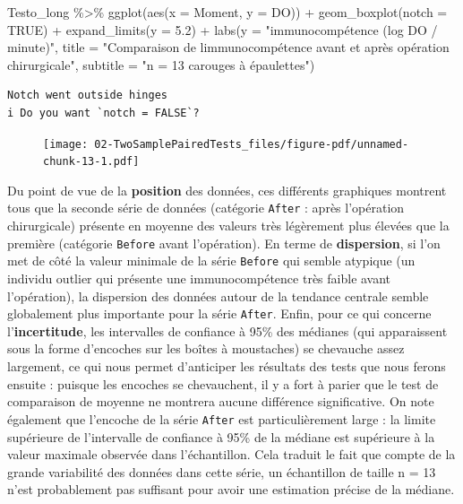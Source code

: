 \documentclass[
  a4paper,
  DIV=11,
  numbers=noendperiod,
  oneside]{scrreprt}
\newenvironment{Shaded}{}{}
\newcommand{\AttributeTok}[1]{\textcolor[rgb]{0.84,0.23,0.29}{#1}}
\newcommand{\ConstantTok}[1]{\textcolor[rgb]{0.00,0.36,0.77}{#1}}
\newcommand{\FloatTok}[1]{\textcolor[rgb]{0.00,0.36,0.77}{#1}}
\newcommand{\FunctionTok}[1]{\textcolor[rgb]{0.44,0.26,0.76}{#1}}
\newcommand{\NormalTok}[1]{\textcolor[rgb]{0.14,0.16,0.18}{#1}}
\newcommand{\SpecialCharTok}[1]{\textcolor[rgb]{0.00,0.36,0.77}{#1}}
\newcommand{\StringTok}[1]{\textcolor[rgb]{0.01,0.18,0.38}{#1}}
\begin{document}
\begin{Shaded}
\begin{Highlighting}[]
\NormalTok{Testo\_long }\SpecialCharTok{\%\textgreater{}\%}
  \FunctionTok{ggplot}\NormalTok{(}\FunctionTok{aes}\NormalTok{(}\AttributeTok{x =}\NormalTok{ Moment, }\AttributeTok{y =}\NormalTok{ DO)) }\SpecialCharTok{+}
  \FunctionTok{geom\_boxplot}\NormalTok{(}\AttributeTok{notch =} \ConstantTok{TRUE}\NormalTok{) }\SpecialCharTok{+}
  \FunctionTok{expand\_limits}\NormalTok{(}\AttributeTok{y =} \FloatTok{5.2}\NormalTok{) }\SpecialCharTok{+}
  \FunctionTok{labs}\NormalTok{(}\AttributeTok{y =} \StringTok{"immunocompétence (log DO / minute)"}\NormalTok{,}
       \AttributeTok{title =} \StringTok{"Comparaison de l\textquotesingle{}immunocompétence avant et après opération chirurgicale"}\NormalTok{,}
       \AttributeTok{subtitle =} \StringTok{"n = 13 carouges à épaulettes"}\NormalTok{)}
\end{Highlighting}
\end{Shaded}

\begin{verbatim}
Notch went outside hinges
i Do you want `notch = FALSE`?
\end{verbatim}

\begin{figure}[H]

{\centering \texttt{[image: 02-TwoSamplePairedTests\_files/figure-pdf/unnamed-chunk-13-1.pdf]}

}

\end{figure}

Du point de vue de la \textbf{position} des données, ces différents
graphiques montrent tous que la seconde série de données (catégorie
\texttt{After} : après l'opération chirurgicale) présente en moyenne des
valeurs très légèrement plus élevées que la première (catégorie
\texttt{Before} avant l'opération). En terme de \textbf{dispersion}, si
l'on met de côté la valeur minimale de la série \texttt{Before} qui
semble atypique (un individu outlier qui présente une immunocompétence
très faible avant l'opération), la dispersion des données autour de la
tendance centrale semble globalement plus importante pour la série
\texttt{After}. Enfin, pour ce qui concerne l'\textbf{incertitude}, les
intervalles de confiance à 95\% des médianes (qui apparaissent sous la
forme d'encoches sur les boîtes à moustaches) se chevauche assez
largement, ce qui nous permet d'anticiper les résultats des tests que
nous ferons ensuite : puisque les encoches se chevauchent, il y a fort à
parier que le test de comparaison de moyenne ne montrera aucune
différence significative. On note également que l'encoche de la série
\texttt{After} est particulièrement large : la limite supérieure de
l'intervalle de confiance à 95\% de la médiane est supérieure à la
valeur maximale observée dans l'échantillon. Cela traduit le fait que
compte de la grande variabilité des données dans cette série, un
échantillon de taille n = 13 n'est probablement pas suffisant pour avoir
une estimation précise de la médiane.
\end{document}
